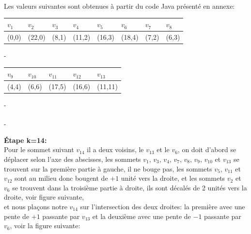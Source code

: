 \documentclass[hidelinks,letterpaper,12pt]{article}
\begin{document}
Les valeurs suivantes sont obtenues à partir du code Java présenté en annexe: \\
\begin{tabularx}{\textwidth}{|*{8}{X|}}
\hline
$v_1$ & $v_2$  & $v_3$ & $v_4$  & $v_5$  & $v_6$  & $v_7$ & $v_8$ \\
\hline 
(0,0) & (22,0) & (8,1) & (11,2) & (16,3) & (18,4) & (7,2) & (6,3) \\
\hline
\end{tabularx}
{\color{white}-}
\\
\begin{tabularx}{\textwidth}{|*{5}{X|}}
\hline
$v_9$ & $v_{10}$ & $v_{11}$ & $v_{12}$ & $v_{13}$ \\
\hline 
(4,4) & (6,6)    & (17,5)   & (16,6)   & (11,11) \\
\hline
\end{tabularx}
{\color{white}-}
\\ \\
{\color{white}-}

\newpage
\textbf{Étape k=14:}
\\
Pour le sommet suivant $v_{14}$ il a deux voisins, le $v_{13}$ et le $v_6$,
on doit d'abord se déplacer selon l'axe des abscisses, 
les sommets $v_1$, $v_3$, $v_4$, $v_7$, $v_8$, $v_9$, $v_{10}$ et $v_{13}$ se trouvent sur la première partie à gauche, il ne bouge pas, 	
les sommets $v_5$, $v_{11}$ et $v_{12}$ sont au milieu donc bougent de $+1$ unité vers la droite,
et les sommets $v_2$ et $v_6$ se trouvent dans la troisième partie à droite, ils sont décalés de 2 unités vers la droite, voir figure suivante, \\
et nous plaçons notre $v_{14}$ sur l'intersection des deux droites: la première avec une pente de $+1$ passante par $v_{13}$ et la deuxième avec une pente de $-1$ passante par $v_6$, voir la figure suivante:
\end{document}
